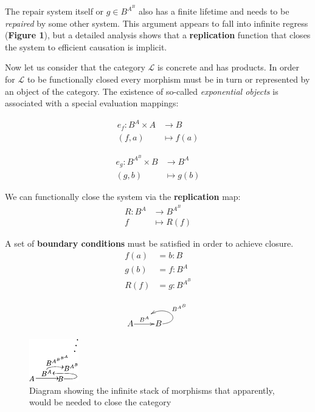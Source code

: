 \documentclass[aps,twocolumn]{revtex4-1}
\begin{document}
 The repair system itself or $g \in B^{A^B}$ also has a finite lifetime and needs to be {\it repaired} by some other system. 
This argument appears to fall into infinite regress (\textbf{Figure 1}), but a detailed analysis shows that a \textbf{replication} function that closes the system to efficient causation is implicit.

Now let us consider that the category $\mathcal{L}$ is concrete and has products. In order for  $\mathcal{L}$  to be  functionally closed every morphism must be in turn or represented by an object of the category. The existence of so-called {\it exponential objects} is associated with a special evaluation mappings:

\begin{align*}
e_f : B^A \times A &\longrightarrow B\\
(f,a) & \longmapsto f(a)
\end{align*}
		
\begin{align*}
			e_g: B^{A^B} \times B &\longrightarrow B^A\\
	    			            (g,b) & \longmapsto    g(b)
			\end{align*}		

We can functionally close the system via the \textbf{replication} map:
\begin{align*}
R: B^A & \longrightarrow B^{A^B}\\
f & \longmapsto R(f)
\end{align*}	
		
A set of \textbf{boundary conditions} must be satisfied in order to achieve closure.
			\begin{align*}
			f(a) &= b : B\\
			g(b) &= f : B^A\\
			R(f) &= g : B^{A^B}
			\end{align*}
\begin{center}

		$$	\xymatrix@1{
			A \ar[r]^{B^A}="ba" & B \ar@(r,ur)_(.5) {B^{A^B}} [];"ba"}$$
\end{center}
			
					
\begin{figure}
\noindent\includegraphics[width=0.45\columnwidth]{fig/mrcatinf.pdf}
\caption{Diagram showing the infinite stack of morphisms that apparently, would be needed to close the category}
\label{fig:hom}
\end{figure}
\end{document}
